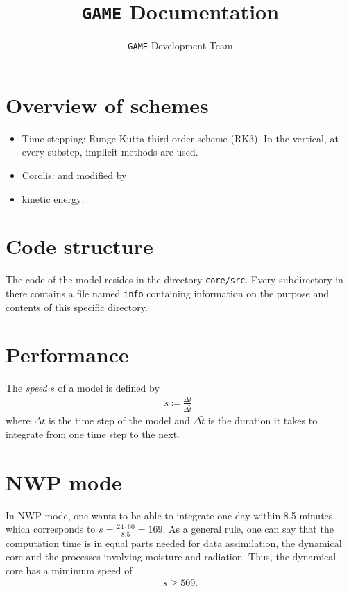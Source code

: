 \documentclass[10pt]{report}
\title{\texttt{GAME} Documentation}
\author{\texttt{GAME} Development Team}
\date{}
\begin{document}
\maketitle

\chapter{Overview of schemes}
\label{chap:overview_of_schemes}

\begin{itemize}
\item Time stepping: Runge-Kutta third order scheme (RK3). In the vertical, at every substep, implicit methods are used.
\item Corolis: \cite{thuburn_f_discrete_plane} and \cite{ringler_trsk} modified by \cite{doi:10.1002/qj.3294}
\item kinetic energy: \cite{doi:10.1002/qj.1960}
\end{itemize}

\chapter{Code structure}
\label{chap:code_structure}

The code of the model resides in the directory \texttt{core/src}. Every subdirectory in there contains a file named \texttt{info} containing information on the purpose and contents of this specific directory.

\chapter{Performance}
\label{chap:performance}

The \textit{speed} $s$ of a model is defined by
%
\begin{eqnarray}
s \coloneqq \frac{\Delta t}{\Delta\tilde{t}},
\end{eqnarray}
%
where $\Delta t$ is the time step of the model and $\Delta\tilde{t}$ is the duration it takes to integrate from one time step to the next.

\chapter{NWP mode}
\label{chap:nwp_mode}

In NWP mode, one wants to be able to integrate one day within 8.5 minutes, which corresponds to $s = \frac{24\cdot 60}{8.5} = 169$. As a general rule, one can say that the computation time is in equal parts needed for data assimilation, the dynamical core and the processes involving moisture and radiation. Thus, the dynamical core has a mimimum speed of
%
\begin{eqnarray}
s \geq 509.
\end{eqnarray}
\end{document}
